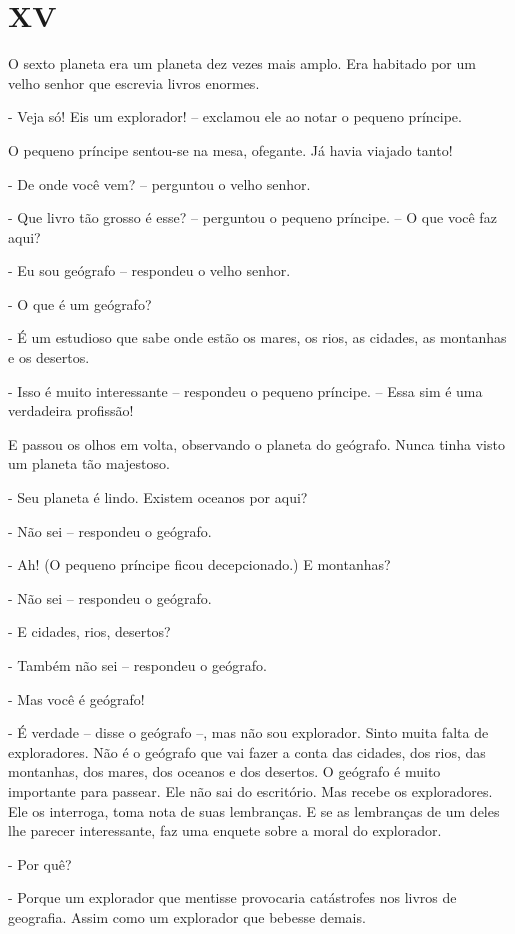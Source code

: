 \chapter{XV}

O sexto planeta era um planeta dez vezes mais amplo. Era habitado por um
velho senhor que escrevia livros enormes.

- Veja só! Eis um explorador! -- exclamou ele ao notar o pequeno
príncipe.

O pequeno príncipe sentou-se na mesa, ofegante. Já havia viajado tanto!

- De onde você vem? -- perguntou o velho senhor.

- Que livro tão grosso é esse? -- perguntou o pequeno príncipe. -- O que
você faz aqui?

- Eu sou geógrafo -- respondeu o velho senhor.

- O que é um geógrafo?

- É um estudioso que sabe onde estão os mares, os rios, as cidades, as
montanhas e os desertos.

- Isso é muito interessante -- respondeu o pequeno príncipe. -- Essa sim
é uma verdadeira profissão!

E passou os olhos em volta, observando o planeta do geógrafo. Nunca
tinha visto um planeta tão majestoso.

- Seu planeta é lindo. Existem oceanos por aqui?

- Não sei -- respondeu o geógrafo.

- Ah! (O pequeno príncipe ficou decepcionado.) E montanhas?

- Não sei -- respondeu o geógrafo.

- E cidades, rios, desertos?

- Também não sei -- respondeu o geógrafo.

- Mas você é geógrafo!

- É verdade -- disse o geógrafo --, mas não sou explorador. Sinto muita
falta de exploradores. Não é o geógrafo que vai fazer a conta das
cidades, dos rios, das montanhas, dos mares, dos oceanos e dos desertos.
O geógrafo é muito importante para passear. Ele não sai do escritório.
Mas recebe os exploradores. Ele os interroga, toma nota de suas
lembranças. E se as lembranças de um deles lhe parecer interessante, faz
uma enquete sobre a moral do explorador.

- Por quê?

- Porque um explorador que mentisse provocaria catástrofes nos livros de
geografia. Assim como um explorador que bebesse demais.

